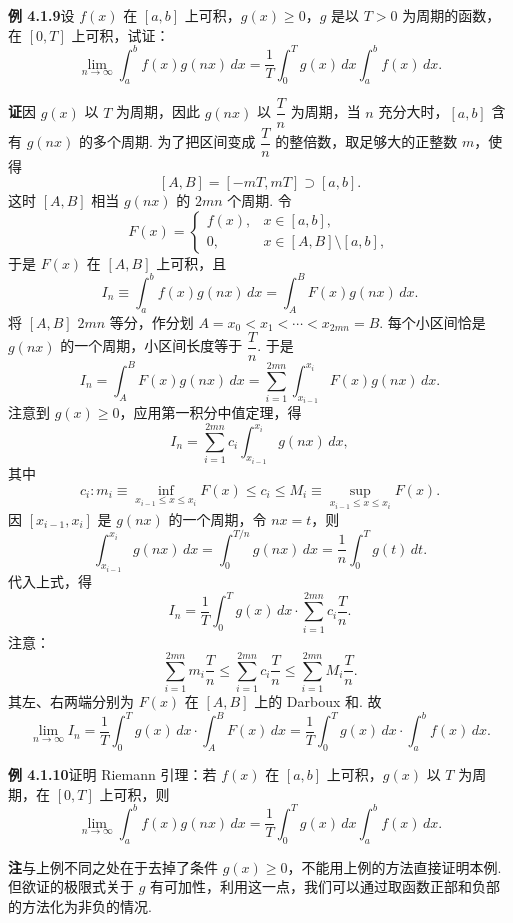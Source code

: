 \documentclass[UTF8, 12pt, fontset=fandol, oneside]{ctexart}
\begin{document}
\noindent\textbf{例 4.1.9}\quad 设 $f(x)$ 在 $[a,b]$ 上可积，$g(x)\ge0$，$g$ 是以 $T>0$ 为周期的函数，在 $[0,T]$ 上可积，试证：
\[
\lim_{n\to\infty}\int_a^b f(x)g(nx)\,dx
=\frac1T\int_0^T g(x)\,dx\int_a^b f(x)\,dx.
\]

\noindent\textbf{证}\quad 因 $g(x)$ 以 $T$ 为周期，因此 $g(nx)$ 以 $\dfrac Tn$ 为周期，当 $n$ 充分大时，$[a,b]$ 含有 $g(nx)$ 的多个周期. 为了把区间变成 $\dfrac Tn$ 的整倍数，取足够大的正整数 $m$，使得
\[
[A,B]=[-mT,mT]\supset[a,b].
\]
这时 $[A,B]$ 相当 $g(nx)$ 的 $2mn$ 个周期. 令
\[
F(x)=
\begin{cases}
f(x), & x\in[a,b],\\
0, & x\in[A,B]\setminus[a,b],
\end{cases}
\]
于是 $F(x)$ 在 $[A,B]$ 上可积，且
\[
I_n\equiv\int_a^b f(x)g(nx)\,dx
=\int_A^B F(x)g(nx)\,dx.
\]
将 $[A,B]$ $2mn$ 等分，作分划 $A=x_0<x_1<\cdots<x_{2mn}=B$. 每个小区间恰是 $g(nx)$ 的一个周期，小区间长度等于 $\dfrac Tn$. 于是
\[
I_n=\int_A^B F(x)g(nx)\,dx
=\sum_{i=1}^{2mn}\int_{x_{i-1}}^{x_i}F(x)g(nx)\,dx.
\]
注意到 $g(x)\ge0$，应用第一积分中值定理，得
\[
I_n=\sum_{i=1}^{2mn}c_i\int_{x_{i-1}}^{x_i}g(nx)\,dx,
\]
其中
\[
c_i:m_i\equiv\inf_{x_{i-1}\le x\le x_i}F(x)
\le c_i\le
M_i\equiv\sup_{x_{i-1}\le x\le x_i}F(x).
\]
因 $[x_{i-1},x_i]$ 是 $g(nx)$ 的一个周期，令 $nx=t$，则
\[
\int_{x_{i-1}}^{x_i}g(nx)\,dx
=\int_0^{T/n}g(nx)\,dx
=\frac1n\int_0^T g(t)\,dt.
\]
代入上式，得
\[
I_n=\frac1T\int_0^Tg(x)\,dx\cdot
\sum_{i=1}^{2mn}c_i\frac Tn.
\]
注意：
\[
\sum_{i=1}^{2mn}m_i\frac Tn
\le \sum_{i=1}^{2mn}c_i\frac Tn
\le \sum_{i=1}^{2mn}M_i\frac Tn.
\]
其左、右两端分别为 $F(x)$ 在 $[A,B]$ 上的 Darboux 和. 故
\[
\lim_{n\to\infty}I_n
=\frac1T\int_0^Tg(x)\,dx\cdot\int_A^B F(x)\,dx
=\frac1T\int_0^Tg(x)\,dx\cdot\int_a^b f(x)\,dx.
\]

\noindent\textbf{例 4.1.10}\quad 证明 Riemann 引理：若 $f(x)$ 在 $[a,b]$ 上可积，$g(x)$ 以 $T$ 为周期，在 $[0,T]$ 上可积，则
\[
\lim_{n\to\infty}\int_a^b f(x)g(nx)\,dx
=\frac1T\int_0^T g(x)\,dx\int_a^b f(x)\,dx.
\]

\noindent\textbf{注}\quad 与上例不同之处在于去掉了条件 $g(x)\ge0$，不能用上例的方法直接证明本例. 但欲证的极限式关于 $g$ 有可加性，利用这一点，我们可以通过取函数正部和负部的方法化为非负的情况.
\end{document}
